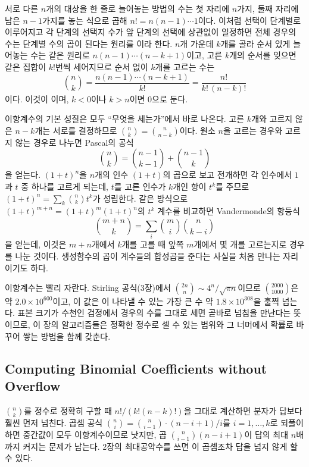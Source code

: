 서로 다른 $n$개의 대상을 한 줄로 늘어놓는 방법의 수는 첫 자리에 $n$가지, 둘째 자리에 남은 $n-1$가지를 놓는 식으로 곱해 $n!=n(n-1)\cdots1$이다. 이처럼 선택이 단계별로 이루어지고 각 단계의 선택지 수가 앞 단계의 선택에 상관없이 일정하면 전체 경우의 수는 단계별 수의 곱이 된다는 원리를 이라 한다. $n$개 가운데 $k$개를 골라 순서 있게 늘어놓는 수는 같은 원리로 $n(n-1)\cdots(n-k+1)$이고, 고른 $k$개의 순서를 잊으면 같은 집합이 $k!$번씩 세어지므로 순서 없이 $k$개를 고르는 수는
\[
\binom nk=\frac{n(n-1)\cdots(n-k+1)}{k!}=\frac{n!}{k!\,(n-k)!}
\]
이다. 이것이 이며, $k<0$이나 $k>n$이면 $0$으로 둔다.

이항계수의 기본 성질은 모두 ``무엇을 세는가''에서 바로 나온다. 고른 $k$개와 고르지 않은 $n-k$개는 서로를 결정하므로 $\binom nk=\binom n{n-k}$이다. 원소 $n$을 고르는 경우와 고르지 않는 경우로 나누면 Pascal의 공식
\begin{equation}
\label{eq:pascal}
\binom nk=\binom{n-1}{k-1}+\binom{n-1}k
\end{equation}
을 얻는다. $(1+t)^n$을 $n$개의 인수 $(1+t)$의 곱으로 보고 전개하면 각 인수에서 $1$과 $t$ 중 하나를 고르게 되는데, $t$를 고른 인수가 $k$개인 항이 $t^k$를 주므로  $(1+t)^n=\sum_k\binom nkt^k$가 성립한다. 같은 방식으로 $(1+t)^{m+n}=(1+t)^m(1+t)^n$의 $t^k$ 계수를 비교하면 Vandermonde의 항등식
\begin{equation}
\label{eq:vandermonde}
\binom{m+n}k=\sum_{i}\binom mi\binom n{k-i}
\end{equation}
을 얻는데, 이것은 $m+n$개에서 $k$개를 고를 때 앞쪽 $m$개에서 몇 개를 고르는지로 경우를 나눈 것이다. 생성함수의 곱이 계수들의 합성곱을 준다는 사실을 처음 만나는 자리이기도 하다.

이항계수는 빨리 자란다. Stirling 공식(3장)에서 $\binom{2n}n\sim4^n/\sqrt{\pi n}$이므로 $\binom{2000}{1000}$은 약 $2.0\times10^{600}$이고, 이 값은 이 나타낼 수 있는 가장 큰 수 약 $1.8\times10^{308}$을 훌쩍 넘는다. 표본 크기가 수천인 검정에서 경우의 수를 그대로 세면 곧바로 넘침을 만난다는 뜻이므로, 이 장의 알고리즘들은 정확한 정수로 셀 수 있는 범위와 그 너머에서 확률로 바꾸어 쌓는 방법을 함께 갖춘다.

\subsection{Computing Binomial Coefficients without Overflow}

$\binom nk$를 정수로 정확히 구할 때 $n!/(k!(n-k)!)$을 그대로 계산하면 분자가 답보다 훨씬 먼저 넘친다. 곱셈 공식 $\binom ni=\binom n{i-1}\cdot(n-i+1)/i$를 $i=1,\dots,k$로 되풀이하면 중간값이 모두 이항계수이므로 낫지만, 곱 $\binom n{i-1}(n-i+1)$이 답의 최대 $n$배까지 커지는 문제가 남는다. 2장의 최대공약수를 쓰면 이 곱셈조차 답을 넘지 않게 할 수 있다.

